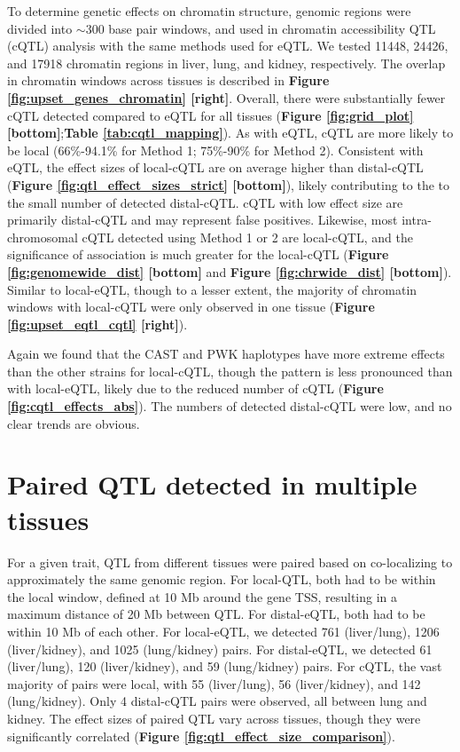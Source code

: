 \documentclass[9pt,twocolumn,twoside]{gsajnl}
\newcommand{\WV}[2]{\textcolor{red}{#1\footnote{\textcolor{red}{WV: #2}}}}
\begin{document}
To determine genetic effects on chromatin structure, genomic regions were divided into $\sim$300 base pair windows, and used in chromatin accessibility QTL (cQTL) analysis with the same methods used for eQTL. We tested 11448, 24426, and 17918 chromatin regions in liver, lung, and kidney, respectively. The overlap in chromatin windows across tissues is described in \textbf{Figure \ref{fig:upset_genes_chromatin} [right]}. Overall, there were substantially fewer cQTL detected compared to eQTL for all tissues (\textbf{Figure \ref{fig:grid_plot} [bottom]};\textbf{Table \ref{tab:cqtl_mapping}}). As with eQTL, cQTL are more likely to be local (66\%-94.1\% for Method 1; 75\%-90\% for Method 2).
Consistent with eQTL, the effect sizes of local-cQTL are on average higher than distal-cQTL (\textbf{Figure \ref{fig:qtl_effect_sizes_strict} [bottom]}), likely contributing to the to the small number of detected distal-cQTL. cQTL with low effect size are primarily distal-cQTL and may represent false positives. Likewise, most intra-chromosomal cQTL detected using Method 1 or 2 are local-cQTL, and the significance of association is much greater for the local-cQTL  (\textbf{Figure \ref{fig:genomewide_dist} [bottom]} and \textbf{Figure \ref{fig:chrwide_dist} [bottom]}). Similar to local-eQTL, though to a lesser extent, the majority of chromatin windows with local-cQTL were only observed in one tissue (\textbf{Figure \ref{fig:upset_eqtl_cqtl} [right]}).

Again we found that the CAST and PWK haplotypes have more extreme effects than the other strains for local-cQTL, though the pattern is less pronounced than with local-eQTL, likely due to the reduced number of cQTL (\textbf{Figure \ref{fig:cqtl_effects_abs}}). The numbers of detected distal-cQTL were low, and no clear trends are obvious.

\section{Paired QTL detected in multiple tissues}


For a given trait, QTL from different tissues were paired based on co-localizing to approximately the same genomic region. For local-QTL, both had to be within the local window, defined at 10 Mb around the gene TSS, resulting in a maximum distance of 20 Mb between QTL. For distal-eQTL, both had to be within 10 Mb of each other. 
For local-eQTL, we detected 761 (liver/lung), 1206 (liver/kidney), and 1025 (lung/kidney) pairs. For distal-eQTL, we detected 61 (liver/lung), 120 (liver/kidney), and 59 (lung/kidney) pairs. For cQTL, the vast majority of pairs were local, with 55 (liver/lung), 56 (liver/kidney), and 142 (lung/kidney). Only 4 distal-cQTL pairs were observed, all between lung and kidney. The effect sizes of paired QTL vary across tissues, though they were significantly correlated (\textbf{Figure \ref{fig:qtl_effect_size_comparison}}).
\end{document}
